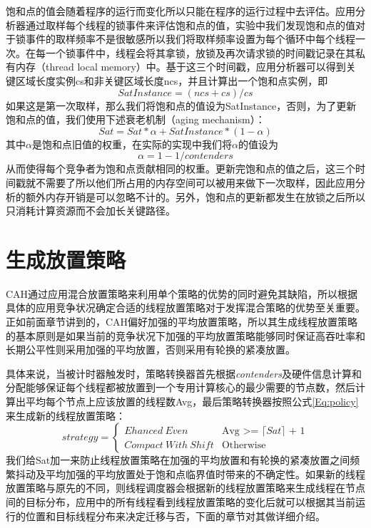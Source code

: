 饱和点的值会随着程序的运行而变化所以只能在程序的运行过程中去评估。应用分析器通过取样每个线程的锁事件来评估饱和点的值，实验中我们发现饱和点的值对于锁事件的取样频率不是很敏感所以我们将取样频率设置为每个循环中每个线程一次。在每一个锁事件中，线程会将其拿锁，放锁及再次请求锁的时间戳记录在其私有内存（thread local memory）中。基于这三个时间戳，应用分析器可以得到关键区域长度实例cs和非关键区域长度ncs，并且计算出一个饱和点实例，即
\begin{equation}\label{Eq:saturationInstance}
     SatInstance = (ncs + cs) / cs
\end{equation}
如果这是第一次取样，那么我们将饱和点的值设为SatInstance，否则，为了更新饱和点的值，我们使用下述衰老机制（aging mechanism）：
\begin{equation}
     Sat = Sat * \alpha + SatInstance * (1 - \alpha)
\end{equation}
其中$\alpha$是饱和点旧值的权重，在实际的实现中我们将$\alpha$的值设为
\begin{equation}
     \alpha = 1 - 1/contenders
\end{equation} 
从而使得每个竞争者为饱和点贡献相同的权重。更新完饱和点的值之后，这三个时间戳就不需要了所以他们所占用的内存空间可以被用来做下一次取样，因此应用分析的额外内存开销是可以忽略不计的。另外，饱和点的更新都发生在放锁之后所以只消耗计算资源而不会加长关键路径。

\section{生成放置策略}
CAH通过应用混合放置策略来利用单个策略的优势的同时避免其缺陷，所以根据具体的应用竞争状况确定合适的线程放置策略对于发挥混合策略的优势至关重要。正如前面章节讲到的，CAH偏好加强的平均放置策略，所以其生成线程放置策略的基本原则是如果当前的竞争状况下加强的平均放置策略能够同时保证高吞吐率和长期公平性则采用加强的平均放置，否则采用有轮换的紧凑放置。

具体来说，当被计时器触发时，策略转换器首先根据\emph{contenders}及硬件信息计算和分配能够保证每个线程都被放置到一个专用计算核心的最少需要的节点数，然后计算出平均每个节点上应该放置的线程数Avg，最后策略转换器按照公式\ref{Eq:policy}来生成新的线程放置策略：
\begin{equation}\label{Eq:policy}
strategy=
\begin{cases}
Ehanced\ Even &\text{Avg >= $\lceil Sat \rceil$ + 1}\\
Compact\  With\  Shift &\text{Otherwise}
\end{cases}
\end{equation}
我们给Sat加一来防止线程放置策略在加强的平均放置和有轮换的紧凑放置之间频繁抖动及平均加强的平均放置处于饱和点临界值时带来的不确定性。如果新的线程放置策略与原先的不同，则线程调度器会根据新的线程放置策略来生成线程在节点间的目标分布，应用中的所有线程看到线程放置策略的变化后就可以根据其当前运行的位置和目标线程分布来决定迁移与否，下面的章节对其做详细介绍。

